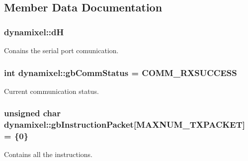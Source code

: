 \subsection{Member Data Documentation}
\hypertarget{classdynamixel_ae003cc90ada6d7b70eaa4ea9d42d4deb}{}
\subsubsection[{d\+H}]{ dynamixel\+::d\+H\hspace{0.3cm}{\ttfamily [private]}}\label{classdynamixel_ae003cc90ada6d7b70eaa4ea9d42d4deb}


Conains the serial port comunication. 

\hypertarget{classdynamixel_a5b603f6bed7ccc595f1f50bd6a6ebbfc}{}
\subsubsection[{gb\+Comm\+Status}]{\setlength{\rightskip}{0pt plus 5cm}int dynamixel\+::gb\+Comm\+Status = {\bf C\+O\+M\+M\+\_\+\+R\+X\+S\+U\+C\+C\+E\+S\+S}\hspace{0.3cm}{\ttfamily [private]}}\label{classdynamixel_a5b603f6bed7ccc595f1f50bd6a6ebbfc}


Current communication status. 

\hypertarget{classdynamixel_afd94dcf01b8e96298727776e222de722}{}
\subsubsection[{gb\+Instruction\+Packet}]{\setlength{\rightskip}{0pt plus 5cm}unsigned char dynamixel\+::gb\+Instruction\+Packet\mbox{[}{\bf M\+A\+X\+N\+U\+M\+\_\+\+T\+X\+P\+A\+C\+K\+E\+T}\mbox{]} = \{0\}\hspace{0.3cm}{\ttfamily [private]}}\label{classdynamixel_afd94dcf01b8e96298727776e222de722}


Contains all the instructions. 

\hypertarget{classdynamixel_a9d590ce24791d111c2db9b66be1e046d}{}
